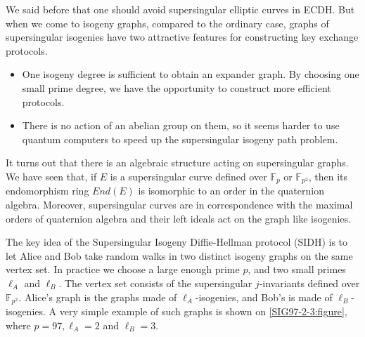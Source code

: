 \documentclass{article}
\theoremstyle{theorem}
\theoremstyle{definition}
\begin{document}
We said before that one should avoid supersingular elliptic curves in ECDH. But when we come to isogeny graphs, compared to the ordinary case, graphs of supersingular isogenies have two attractive features for constructing key exchange protocols. 
	\begin{itemize}
		\item One isogeny degree is sufficient to obtain an expander graph. By choosing one small prime degree, we have the opportunity to construct more efficient protocols.
		
		\item  There is no action of an abelian group on them, so it seems harder to use quantum computers to speed up the supersingular isogeny path problem.
	\end{itemize}

It turns out that there is an algebraic structure acting on supersingular graphs. We have seen that, if $E$ is a supersingular curve defined over $\mathbb{F}_p$ or $\mathbb{F}_{p^2}$, then its endomorphism ring $End(E)$ is isomorphic to an order in the quaternion algebra. Moreover, supersingular curves are in correspondence with the maximal orders of quaternion algebra and their left ideals act on the graph like isogenies.

The key idea of the Supersingular Isogeny Diffie-Hellman protocol (SIDH) is to let Alice and Bob take random walks in two distinct isogeny graphs on the same vertex set. In practice we choose a large enough prime $p$, and two small primes $\ell_A$ and $\ell_B$. The vertex set consists of the supersingular $j$-invariants defined over $\mathbb{F}_{p^2}$. Alice's graph is the graphs made of $\ell_A$-isogenies, and Bob's is made of $\ell_B$-isogenies. A very simple example of such graphs is shown on \cref{SIG97-2-3:figure}, where $p = 97, \ell_A = 2$ and $\ell_B = 3$.
\end{document}
